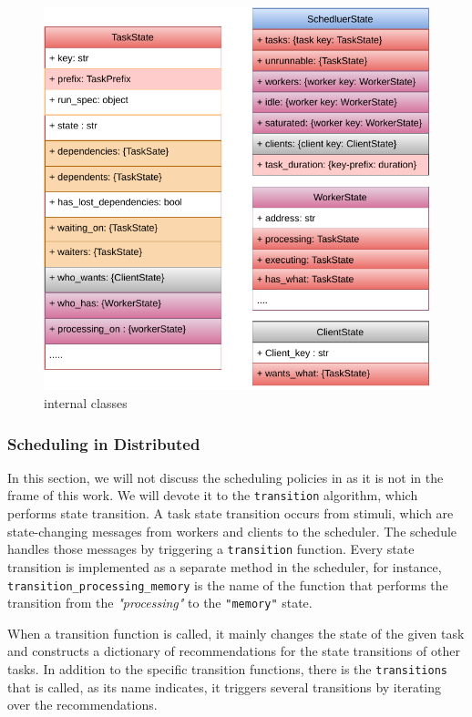 \begin{figure}[tb]\centering
\includegraphics{figures/DaskScheduler.pdf}
\caption{\dask internal classes }
\label{figdaskinternal}
\end{figure}

\subsubsection{Scheduling in \dask Distributed}\label{sec:scheduling}
In this section, we will not discuss the scheduling policies in \dask as it is not in the frame of this work. We will devote it to the \texttt{transition} algorithm, which performs state transition.
A task state transition occurs from stimuli, which are state-changing messages from workers and clients to the scheduler. 
The schedule handles those messages by triggering a \texttt{transition} function. Every state transition is implemented as a separate method in the scheduler, for instance, \texttt{transition\_processing\_memory} is the name of the function that performs the transition from the \textit{"processing"} to the \texttt{"memory"} state.

When a transition function is called, it mainly changes the state of the given task and constructs a dictionary of recommendations for the state transitions of other tasks. In addition to the specific transition functions, there is the \texttt{transitions} that is called, as its name indicates, it triggers several transitions by iterating over the recommendations. 

